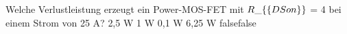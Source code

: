     {Welche Verlustleistung erzeugt ein Power-MOS-FET mit $R\_\{\textrm\{DSon\}\}$ = 4 \mOhm bei einem Strom von 25 A?}
    {2,5 W}
    {1 W}
    {0,1 W}
    {6,25 W}
    {false}{false}